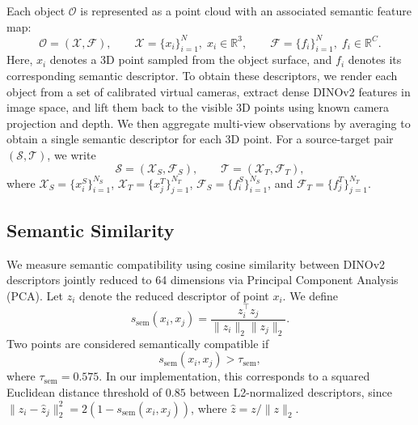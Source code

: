 Each object \(\mathcal{O}\) is represented as a point cloud with an associated semantic feature map:
\begin{equation}
\label{eq:object_representation}
\mathcal{O}=(\mathcal{X},\mathcal{F}),
\qquad
\mathcal{X}=\{x_i\}_{i=1}^{N}, \; x_i\in\mathbb{R}^{3},
\qquad
\mathcal{F}=\{f_i\}_{i=1}^{N}, \; f_i\in\mathbb{R}^{C}.
\end{equation}
Here, \(x_i\) denotes a 3D point sampled from the object surface, and \(f_i\) denotes its corresponding semantic descriptor.
% 
To obtain these descriptors, we render each object from a set of calibrated virtual cameras, extract dense DINOv2 \cite{oquab2024dinov2} features in image space, and lift them back to the visible 3D points using known camera projection and depth.
We then aggregate multi-view observations by averaging to obtain
a single semantic descriptor for each 3D point.
% 
For a source-target pair \((\mathcal{S},\mathcal{T})\), we write
\begin{equation}
\label{eq:source_target_representation}
\mathcal{S}=(\mathcal{X}_S,\mathcal{F}_S),
\qquad
\mathcal{T}=(\mathcal{X}_T,\mathcal{F}_T),
\end{equation}
where
\(\mathcal{X}_S=\{x_i^S\}_{i=1}^{N_S}\),
\(\mathcal{X}_T=\{x_j^T\}_{j=1}^{N_T}\),
\(\mathcal{F}_S=\{f_i^S\}_{i=1}^{N_S}\), and
\(\mathcal{F}_T=\{f_j^T\}_{j=1}^{N_T}\).

\subsection{Semantic Similarity}
\label{sec:semantic_sim}

We measure semantic compatibility using cosine similarity between
DINOv2~\cite{oquab2024dinov2} descriptors jointly reduced to 64
dimensions via Principal Component Analysis (PCA).
Let $z_i$ denote the reduced descriptor of point $x_i$.
We define
\begin{equation}
\label{eq:semantic_similarity}
s_{\mathrm{sem}}(x_i,x_j)
=
\frac{z_i^\top z_j}{\|z_i\|_2 \|z_j\|_2}.
\end{equation}
Two points are considered semantically compatible if
\begin{equation}
\label{eq:semantic_compatibility}
s_{\mathrm{sem}}(x_i,x_j) > \tau_{\mathrm{sem}},
\end{equation}
where $\tau_{\mathrm{sem}}=0.575$. In our implementation, this corresponds to a squared Euclidean
distance threshold of $0.85$ between L2-normalized descriptors,
since $\|\hat z_i-\hat z_j\|_2^2=2(1-s_{\mathrm{sem}}(x_i,x_j))$,
where $\hat z=z/\|z\|_2$.


